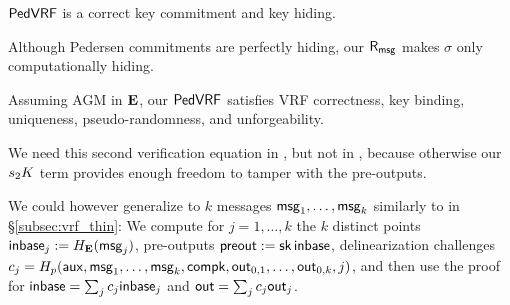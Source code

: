 \begin{lemma}\label{prop:pedersen_vrf_hiding}
${\mathsf{PedVRF}}$ is a correct key commitment and key hiding.
\end{lemma}

Although Pedersen commitments are perfectly hiding, our $\mathsf{R}_\mathsf{msg}$ makes $\sigma$ only computationally hiding.

\begin{proposition}\label{prop:pedersen_vrf}
Assuming AGM in ${\mathbf{E}}$, %
our ${\mathsf{PedVRF}}$ satisfies VRF correctness, key binding, uniqueness,
pseudo-randomness, and unforgeability. %
\end{proposition}

We need this second verification equation in \PedVRF, but not in \ThinVRF,
because otherwise our $s_2 K$ term provides enough freedom to tamper
with the pre-outputs.  

We could however generalize \PedVRF to $k$ messages $\mathsf{msg}_1,\ldots,\mathsf{msg}_k$
similarly to \ThinVRF in \S\ref{subsec:vrf_thin}:  We compute for
$j=1,\ldots,k$ the $k$ distinct
points ${\mathsf{inbase}}_j := H_{{\mathbf{E}}}(\mathsf{msg}_j)$, pre-outputs ${\mathsf{preout}} := \mathsf{sk} \, {\mathsf{inbase}}$,
delinearization challenges
 $c_j = H_p(\mathsf{aux},\mathsf{msg}_1,\ldots,\mathsf{msg}_k,\mathsf{compk},{\mathsf{out}}_{0,1},\ldots,{\mathsf{out}}_{0,k},j)$,
and then use the \PedVRF proof for
 ${\mathsf{inbase}} = \sum_j c_j {\mathsf{inbase}}_j$ and ${\mathsf{out}} = \sum_j c_j {\mathsf{out}}_j$.









